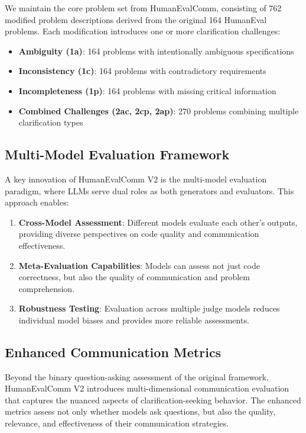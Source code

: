 \documentclass[conference]{IEEEtran}
\begin{document}
We maintain the core problem set from HumanEvalComm, consisting of 762 modified problem descriptions derived from the original 164 HumanEval problems. Each modification introduces one or more clarification challenges:

\begin{itemize}
    \item \textbf{Ambiguity (1a)}: 164 problems with intentionally ambiguous specifications
    \item \textbf{Inconsistency (1c)}: 164 problems with contradictory requirements
    \item \textbf{Incompleteness (1p)}: 164 problems with missing critical information
    \item \textbf{Combined Challenges (2ac, 2cp, 2ap)}: 270 problems combining multiple clarification types
\end{itemize}

\subsection{Multi-Model Evaluation Framework}

A key innovation of HumanEvalComm V2 is the multi-model evaluation paradigm, where LLMs serve dual roles as both generators and evaluators. This approach enables:

\begin{enumerate}
    \item \textbf{Cross-Model Assessment}: Different models evaluate each other's outputs, providing diverse perspectives on code quality and communication effectiveness.
    \item \textbf{Meta-Evaluation Capabilities}: Models can assess not just code correctness, but also the quality of communication and problem comprehension.
    \item \textbf{Robustness Testing}: Evaluation across multiple judge models reduces individual model biases and provides more reliable assessments.
\end{enumerate}

\subsection{Enhanced Communication Metrics}

Beyond the binary question-asking assessment of the original framework, HumanEvalComm V2 introduces multi-dimensional communication evaluation that captures the nuanced aspects of clarification-seeking behavior. The enhanced metrics assess not only whether models ask questions, but also the quality, relevance, and effectiveness of their communication strategies.
\end{document}
